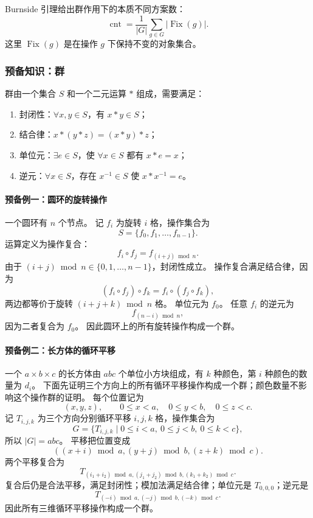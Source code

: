 Burnside 引理给出群作用下的本质不同方案数：
\[
  \operatorname{cnt}
  =\frac{1}{|G|}\sum_{g\in G}|\operatorname{Fix}(g)|.
\]
这里 $\operatorname{Fix}(g)$ 是在操作 $g$ 下保持不变的对象集合。

\subsubsection{预备知识：群}

群由一个集合 $S$ 和一个二元运算 $*$ 组成，需要满足：
\begin{enumerate}
  \item 封闭性：$\forall x,y\in S$，有 $x*y\in S$；
  \item 结合律：$x*(y*z)=(x*y)*z$；
  \item 单位元：$\exists e\in S$，使 $\forall x\in S$ 都有 $x*e=x$；
  \item 逆元：$\forall x\in S$，存在 $x^{-1}\in S$ 使 $x*x^{-1}=e$。
\end{enumerate}

\paragraph{预备例一：圆环的旋转操作}

一个圆环有 $n$ 个节点。
记 $f_i$ 为旋转 $i$ 格，操作集合为
\[
  S=\{f_0,f_1,\ldots,f_{n-1}\}.
\]
运算定义为操作复合：
\[
  f_i\circ f_j=f_{(i+j)\bmod n}.
\]
由于 $(i+j)\bmod n\in\{0,1,\ldots,n-1\}$，封闭性成立。
操作复合满足结合律，因为
\[
  (f_i\circ f_j)\circ f_k=f_i\circ(f_j\circ f_k),
\]
两边都等价于旋转 $(i+j+k)\bmod n$ 格。
单位元为 $f_0$。
任意 $f_i$ 的逆元为
\[
  f_{(n-i)\bmod n},
\]
因为二者复合为 $f_0$。
因此圆环上的所有旋转操作构成一个群。

\paragraph{预备例二：长方体的循环平移}

一个 $a\times b\times c$ 的长方体由 $abc$ 个单位小方块组成，有 $k$ 种颜色，第 $i$ 种颜色的数量为 $d_i$。
下面先证明三个方向上的所有循环平移操作构成一个群；颜色数量不影响这个操作群的证明。
每个位置记为
\[
  (x,y,z),
  \qquad
  0\le x<a,
  \quad 0\le y<b,
  \quad 0\le z<c.
\]
记 $T_{i,j,k}$ 为三个方向分别循环平移 $i,j,k$ 格，操作集合为
\[
  G=\{T_{i,j,k}\mid 0\le i<a,\ 0\le j<b,\ 0\le k<c\},
\]
所以 $|G|=abc$。
平移把位置变成
\[
  ((x+i)\bmod a,(y+j)\bmod b,(z+k)\bmod c).
\]
两个平移复合为
\[
  T_{(i_1+i_2)\bmod a,
     (j_1+j_2)\bmod b,
     (k_1+k_2)\bmod c}.
\]
复合后仍是合法平移，满足封闭性；模加法满足结合律；单位元是 $T_{0,0,0}$；逆元是
\[
  T_{(-i)\bmod a,(-j)\bmod b,(-k)\bmod c}.
\]
因此所有三维循环平移操作构成一个群。

